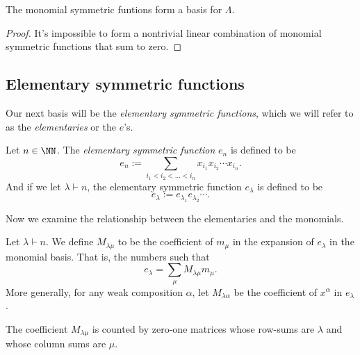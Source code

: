 \documentclass{article}
\begin{document}
\begin{theorem}
    The monomial symmetric funtions form a basis for $\Lambda$.
\end{theorem}

\begin{proof}
    It's impossible to form a nontrivial linear combination of monomial symmetric functions that sum to zero.
\end{proof}

\subsection{Elementary symmetric functions}

Our next basis will be the \textit{elementary symmetric functions}, which we will refer to as the \textit{elementaries} or the $e$'s.

\begin{definition}
    Let $n\in\NN$. The \textit{elementary symmetric function} $e_n$ is defined to be
    \[
        e_n := \sum_{i_1<i_2<\ldots<i_n} x_{i_1}x_{i_2}\cdots x_{i_n}.
    \]
    And if we let $\lambda \vdash n$, the elementary symmetric function $e_\lambda$ is defined to be
    \[
        e_\lambda := e_{\lambda_1}e_{\lambda_2}\cdots.
    \]
\end{definition}

Now we examine the relationship between the elementaries and the monomials.

\begin{definition}
    Let $\lambda \vdash n$. We define $M_{\lambda\mu}$ to be the coefficient of $m_\mu$ in the expansion of $e_\lambda$ in the monomial basis. That is, the numbers such that
    \[
        e_\lambda = \sum_\mu M_{\lambda\mu} m_\mu.
    \]
    More generally, for any weak composition $\alpha$, let $M_{\lambda\alpha}$ be the coefficient of $x^\alpha$ in $e_\lambda$.
\end{definition}

\begin{theorem}
    The coefficient $M_{\lambda\mu}$ is counted by zero-one matrices whose row-sums are $\lambda$ and whose column sums are $\mu$.
\end{theorem}
\end{document}
